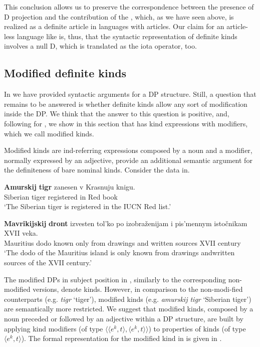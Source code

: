 \documentclass[output=paper
,modfonts
,nonflat]{langsci/langscibook}
\begin{document}
	This conclusion allows us to preserve the correspondence between the presence of D projection and the contribution of the , which, as we have seen above, is realized as a definite article in languages with articles. Our claim for an article-less language like  is, thus, that the syntactic representation of definite kinds involves a null D, which is translated as the iota operator, too. 
	
	\subsection{Modified definite kinds} \label{sec:borik:3.3}
	
	In  we have provided syntactic arguments for a DP structure. Still, a question that remains to be answered is whether definite kinds allow any sort of modification inside the DP. We think that the answer to this question is positive, and, following \citet{Borik2015} for , we show in this section that  has kind expressions with modifiers, which we call modified kinds. 
	
	Modified kinds are ind-referring expressions composed by a noun and a modifier, normally expressed by an adjective, provide an additional semantic argument for the definiteness of  bare nominal kinds. Consider the data in\largerpage {}.
	
	\ea\label{ex:borik:26}
	\ea\label{ex:borik:26a}{
		\gll \textbf{Amurskij} 	\textbf{tigr} 	zanesen	 v Krasnuju 	knigu.\\ 			
		Siberian 	tiger 	registered 	in Red 			book\\
		\glt `The Siberian tiger is registered in the IUCN Red list.'
	}
	
	\ex{}\label{ex:borik:26b}{
		\gll \textbf{Mavrikijskij} \textbf{dront} izvesten tol'ko 	po izobra\v{z}enijam 	i pis'mennym isto\v{c}nikam XVII veka.\\
		Mauritius	dodo	known only	from	drawings 		and	written sources 	XVII century\\
		\glt `The dodo of the Mauritius island is only known from drawings and\largerpage written sources of the XVII century.'
	}
	\z
	\z
	
	The modified DPs in subject position in , similarly to the corresponding non\hyp{}modified versions, denote kinds. However, in comparison to the non-modi\hyp{}fied counterparts (e.g. \textit{tigr} `tiger'), modified kinds (e.g. \textit{amurskij tigr} `Siberian tiger') are semantically more restricted. We suggest that modified kinds, composed by a noun preceded or followed by an adjective within a DP structure, are built by applying kind modifiers (of type $\langle \langle e^k, t\rangle, \langle e^k, t\rangle\rangle$) to  properties of kinds (of type $\langle e^k, t\rangle$). The formal representation for the modified kind in  is given in .
	
\end{document}
